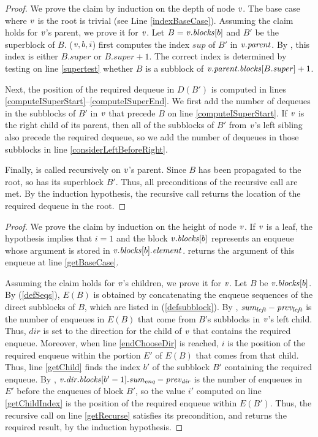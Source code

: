 \indexDequeueRes*
\begin{proof}
We prove the claim by induction on the depth of node $\mbox{\textnormal{\textit{v}}}$. The base case where $\mbox{\textnormal{\textit{v}}}$ is the root is trivial (see Line \ref{indexBaseCase}).
Assuming the claim holds for $\mbox{\textnormal{\textit{v}}}$'s parent, we prove it for $\mbox{\textnormal{\textit{v}}}$.
Let $B=\mbox{\textnormal{\textit{v}}}.\mbox{\textit{blocks}}[b]$ and $B'$ be the superblock of $B$.
($\mbox{\textnormal{\textit{v}}}, b, i$) first computes the index $sup$ of $B'$ in $\mbox{\textnormal{\textit{v}}}.\mbox{\textit{parent}}$.
By , this index is either $B.super$ or $B.super+1$.
The correct index is determined by testing on line \ref{supertest} whether $B$ is a subblock of $\mbox{\textnormal{\textit{v}}}.\mbox{\textit{parent.blocks}}[B.\mbox{\textit{super}}]+1$.

Next, the position of the required dequeue in $D(B')$ is computed in 
lines \ref{computeISuperStart}--\ref{computeISuperEnd}. 
We first add the number of dequeues in the subblocks of $B'$ in $\mbox{\textnormal{\textit{v}}}$ that precede $B$ on line \ref{computeISuperStart}.
If $\mbox{\textnormal{\textit{v}}}$ is the right child of its parent, then all of the subblocks of $B'$ from $\mbox{\textnormal{\textit{v}}}$'s left sibling
also precede the required dequeue, so we add the number of dequeues in those subblocks in line \ref{considerLeftBeforeRight}.

Finally,  is called recursively on $\mbox{\textnormal{\textit{v}}}$'s parent.
Since $B$ has been propagated to the root, so has its superblock $B'$.
Thus, all preconditions of the recursive call are met.
By the induction hypothesis, the recursive call returns the location of the required dequeue in the root.\end{proof}

\getEnqRes*
\begin{proof}
We prove the claim by induction on the height of node $\mbox{\textnormal{\textit{v}}}$.
If $\mbox{\textnormal{\textit{v}}}$ is a leaf, the hypothesis implies that $i=1$ and the block $\mbox{\textnormal{\textit{v}}}.\mbox{\textit{blocks}}[b]$ represents 
an enqueue whose argument is stored in $\mbox{\textnormal{\textit{v}}}.\mbox{\textit{blocks}}[b].\mbox{\textit{element}}$.
 returns the argument of this enqueue at line \ref{getBaseCase}.

Assuming the claim holds for $\mbox{\textnormal{\textit{v}}}$'s children, we prove it for $\mbox{\textnormal{\textit{v}}}$.
Let $B$ be $\mbox{\textnormal{\textit{v}}}.\mbox{\textit{blocks}}[b]$.
By (\ref{defSeqs}),
$E(B)$ is obtained by concatenating the enqueue sequences of the direct subblocks
of $B$, which are listed in (\ref{defsubblock}).
By , $\mbox{\textnormal{\textit{sum\textsubscript{left}}}}-\mbox{\textnormal{\textit{prev\textsubscript{left}}}}$ is the number
of enqueues in $E(B)$ that come from $B$'s subblocks in $\mbox{\textnormal{\textit{v}}}$'s left child.
Thus, $dir$ is set to the direction for the child of $\mbox{\textnormal{\textit{v}}}$ that contains the required enqueue.
Moreover, when line \ref{endChooseDir} is reached, $i$ is the position of the required enqueue within the portion $E'$ of $E(B)$ that comes from that child.
Thus,  line \ref{getChild} finds the index $b'$ of the subblock $B'$ containing the required enqueue.
By , $\mbox{\textnormal{\textit{v}}}.\mbox{\textnormal{\textit{dir.blocks}}}[b'-1].\mbox{\textnormal{\textit{sum\textsubscript{enq}}}} - \mbox{\textnormal{\textit{prev\textsubscript{dir}}}}$ is the number of 
enqueues in $E'$ before the enqueues of block $B'$, so
the value $i'$ computed on line \ref{getChildIndex} is the position of the required enqueue within $E(B')$.
Thus, the recursive call on line \ref{getRecurse} satisfies its precondition, and 
returns the required result, by the induction hypothesis.
\end{proof}

